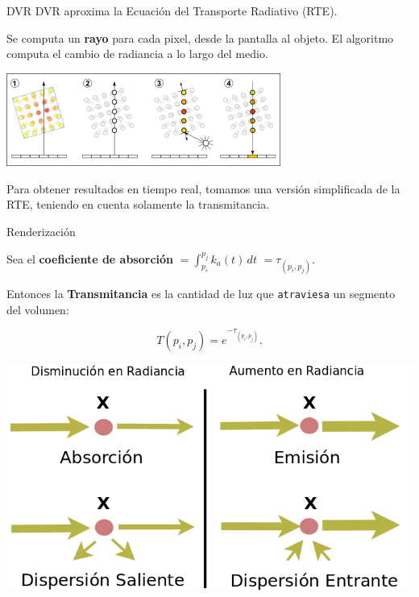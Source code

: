 \documentclass[spanish]{beamer}
\begin{document}
\begin{frame}{DVR}
DVR aproxima la Ecuación del Transporte Radiativo (RTE).

Se computa un \textbf{rayo} para cada pixel, desde la pantalla al objeto. El algoritmo computa el cambio de radiancia a lo largo del medio.


\centerline{\includegraphics[width=9cm]{../figures/dvr}}

Para obtener resultados en tiempo real, tomamos una versión simplificada de la RTE, teniendo en cuenta solamente la transmitancia.
\end{frame}

\begin{frame}{Renderización}


Sea el \textbf{coeficiente de absorción} $ = \int_{p_i}^{p_j} k_a(t) \, dt$  $ = \tau_{(p_i, p_j)}$.


Entonces la \textbf{Transmitancia} es la cantidad de luz que \texttt{atraviesa} un segmento del volumen:

\begin{equation*}
  T(p_i,p_j) = e^{-\tau_{(p_i, p_j)}}.
\end{equation*}


\centerline{\includegraphics[scale = 0.25]{../figures/fenomenosrte}}


\end{frame}
\end{document}

